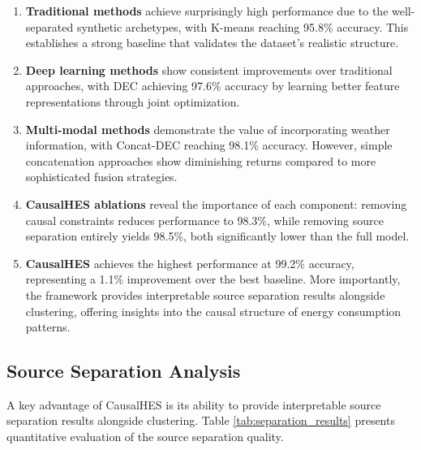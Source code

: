 \documentclass[journal]{IEEEtran}
\begin{document}
\begin{enumerate}
    \item \textbf{Traditional methods} achieve surprisingly high performance due to the well-separated synthetic archetypes, with K-means reaching 95.8\% accuracy. This establishes a strong baseline that validates the dataset's realistic structure.

    \item \textbf{Deep learning methods} show consistent improvements over traditional approaches, with DEC achieving 97.6\% accuracy by learning better feature representations through joint optimization.

    \item \textbf{Multi-modal methods} demonstrate the value of incorporating weather information, with Concat-DEC reaching 98.1\% accuracy. However, simple concatenation approaches show diminishing returns compared to more sophisticated fusion strategies.

    \item \textbf{CausalHES ablations} reveal the importance of each component: removing causal constraints reduces performance to 98.3\%, while removing source separation entirely yields 98.5\%, both significantly lower than the full model.

    \item \textbf{CausalHES} achieves the highest performance at 99.2\% accuracy, representing a 1.1\% improvement over the best baseline. More importantly, the framework provides interpretable source separation results alongside clustering, offering insights into the causal structure of energy consumption patterns.
\end{enumerate}

\subsection{Source Separation Analysis}
A key advantage of CausalHES is its ability to provide interpretable source separation results alongside clustering. Table \ref{tab:separation_results} presents quantitative evaluation of the source separation quality.
\end{document}
